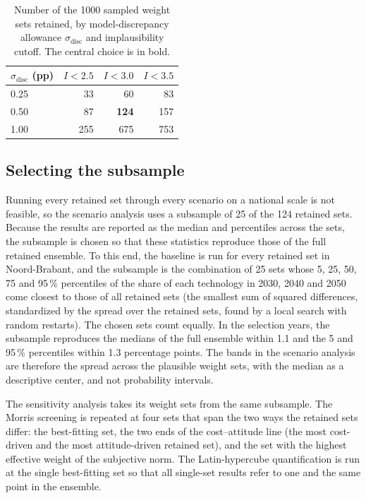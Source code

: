 \documentclass[preprint,12pt,authoryear]{elsarticle}
\begin{document}
\begin{table}[htbp]
  \centering
  \caption{Number of the 1000 sampled weight sets retained, by
  model-discrepancy allowance $\sigma_{\mathrm{disc}}$ and implausibility
  cutoff. The central choice is in bold.}
  \label{tab:retention_sensitivity}
  \begin{tabular}{lrrr}
    \toprule
    $\sigma_{\mathrm{disc}}$ (pp) & $I < 2.5$ & $I < 3.0$ & $I < 3.5$ \\
    \midrule
    0.25 & 33 & 60 & 83 \\
    0.50 & 87 & \textbf{124} & 157 \\
    1.00 & 255 & 675 & 753 \\
    \bottomrule
  \end{tabular}
\end{table}

\subsection{Selecting the subsample}
Running every retained set through every scenario on a national scale is not
feasible, so the scenario analysis uses a subsample of 25 of the 124 retained
sets. Because the results are reported as the median and percentiles across
the sets, the subsample is chosen so that these statistics reproduce those of
the full retained ensemble. To this end, the baseline is run for every
retained set in Noord-Brabant, and the subsample is the combination of 25
sets whose 5, 25, 50, 75 and 95\,\% percentiles of the share of each
technology in 2030, 2040 and 2050 come closest to those of all retained sets
(the smallest sum of squared differences, standardized by the spread over the
retained sets, found by a local search with random restarts). The chosen sets
count equally. In the selection years, the subsample reproduces the medians
of the full ensemble within 1.1 and the 5 and 95\,\% percentiles within 1.3
percentage points. 
The bands in the scenario analysis are therefore the spread across the
plausible weight sets, with the median as a descriptive center, and not
probability intervals.

The sensitivity analysis takes its weight sets from the same subsample. The
Morris screening is repeated at four sets that span the two ways the retained
sets differ: the best-fitting set, the two ends of the cost--attitude line
(the most cost-driven and the most attitude-driven retained set), and the set
with the highest effective weight of the subjective norm. The Latin-hypercube
quantification is run at the single best-fitting set so that all single-set results refer
to one and the same point in the ensemble.
\end{document}
